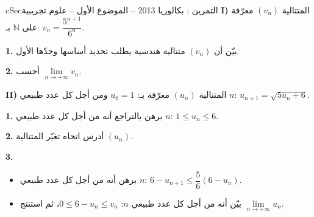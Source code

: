 \documentclass[12pt,a4paper]{article}
\newenvironment{BOX}[2]{\begin{otherlanguage}{english}\begin{arbox}{#1}{#2}}{\end{arbox}\end{otherlanguage}}
\newcounter{exo}
\newenvironment{tamrin}[1]{\stepcounter{exo}\begin{BOX}{cSec}{التمرين \theexo: #1}}{\end{BOX}}
\newcommand{\N}{\mathbb{N}}
\newenvironment{sq}{\begin{itemize}[leftmargin=2.4em,itemsep=3pt]}{\end{itemize}}
\newcommand{\qa}{\item[(أ)]}\newcommand{\qb}{\item[(ب)]}\newcommand{\qc}{\item[(جـ)]}\newcommand{\qd}{\item[(د)]}\newcommand{\qe}{\item[(هـ)]}
\newcommand{\QQ}[1]{\par\smallskip\textbf{#1.} }
\begin{document}
\begin{tamrin}{بكالوريا 2013 -- الموضوع الأول -- علوم تجريبية}
\textbf{I)} المتتالية $(v_n)$ معرّفة على $\N$ بـ: $v_n=\dfrac{5^{n+1}}{6^n}$.
\QQ{1} بيّن أن $(v_n)$ متتالية هندسية يطلب تحديد أساسها وحدّها الأول.
\QQ{2} أحسب $\lim\limits_{n\to+\infty}v_n$.

\textbf{II)} المتتالية $(u_n)$ معرّفة بـ: $u_0=1$ ومن أجل كل عدد طبيعي $n$: $u_{n+1}=\sqrt{5u_n+6}$.
\QQ{1} برهن بالتراجع أنه من أجل كل عدد طبيعي $n$: $1\le u_n\le 6$.
\QQ{2} أدرس اتجاه تغيّر المتتالية $(u_n)$.
\QQ{3}
\begin{sq}
\qa برهن أنه من أجل كل عدد طبيعي $n$: $6-u_{n+1}\le\dfrac{5}{6}\left(6-u_n\right)$.
\qb بيّن أنه من أجل كل عدد طبيعي $n$: $0\le 6-u_n\le v_n$، ثم استنتج $\lim\limits_{n\to+\infty}u_n$.
\end{sq}
\end{tamrin}
\end{document}
